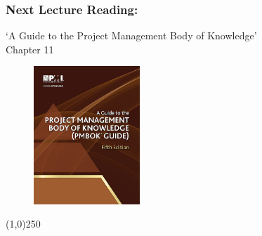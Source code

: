 \begin{frame}
\frametitle{Next Lecture \hfill Reading:}
`A Guide to the Project Management Body of Knowledge'\\ 
Chapter 11
\begin{figure}[h]
	\centering
		\includegraphics[width = 4cm]{images/book.jpg}
\end{figure}
\end{frame}\begin{center}\line(1,0){250}\end{center}







